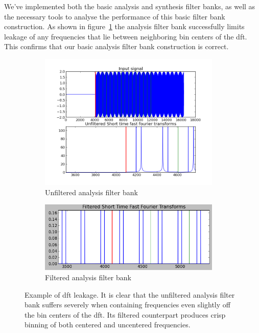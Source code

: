 \documentclass[a4paper,10pt]{article}
\begin{document}
We've implemented both the basic analysis and synthesis filter banks, as well as the necessary tools to analyse the performance of this basic filter bank construction. As shown in 
figure~\ref{filtered_and_unfiltered_analysis} the analysis filter bank successfully limits leakage of any frequencies that lie between neighboring bin centers of the \gls{dft}.
This confirms that our basic analysis filter bank construction is correct.
\begin{figure}[h]
 \begin{subfigure}{0.5\textwidth}
  \includegraphics[width=0.95\textwidth]{unfiltered.png}
  \caption{Unfiltered analysis filter bank}
 \end{subfigure}
 \begin{subfigure}{0.5\textwidth}
  \includegraphics[width=0.95\textwidth]{filtered.png}
  \caption{Filtered analysis filter bank}
 \end{subfigure}
\caption[\gls{dft} Leakage]{Example of \gls{dft} leakage. It is clear that the unfiltered analysis filter bank suffers severely when containing frequencies even slightly off the bin centers
	 of the \gls{dft}. Its filtered counterpart produces crisp binning of both centered and uncentered frequencies.}
\label{filtered_and_unfiltered_analysis}
\end{figure}
\end{document}
